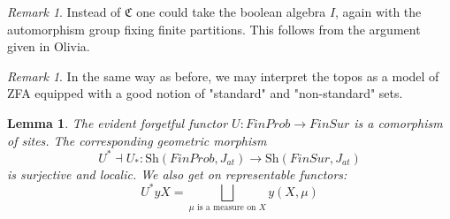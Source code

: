 \documentclass[a4paper]{amsproc}
\theoremstyle{plain}
\newtheorem{lemma}[theorem]{Lemma}
\theoremstyle{definition}
\theoremstyle{remark}
\newtheorem{remark}[theorem]{Remark}
\numberwithin{equation}{section}
\begin{document}
\begin{remark} Instead of $\mathfrak{C}$ one could take the boolean algebra $I$, again with the automorphism group fixing finite partitions. This follows from the argument given in Olivia.
\end{remark}
\begin{remark} In the same way as before, we may interpret the topos as a model of ZFA equipped with a good notion of "standard" and "non-standard" sets.
\end{remark}
\begin{lemma} The evident forgetful functor $U: FinProb\rightarrow FinSur$ is a comorphism of sites. The corresponding geometric morphism 
\[U^*\dashv U_*: \text{Sh}(FinProb, J_{at})\rightarrow  \text{Sh}(FinSur, J_{at})\]
 is surjective and localic. We also get on representable functors:
 \[U^*yX=\bigsqcup_{\mu\text{ is a measure on }X} y(X,\mu)\]%
\end{lemma}
\end{document}
